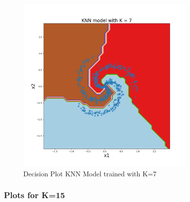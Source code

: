 \begin{figure}[!ht]
    \centering
    \includegraphics[height=3.5in]{Dataset_1b/K_7_decision_plot.png}
    \caption{Decision Plot KNN Model trained with K=7}
    \label{fig:16}
\end{figure}

\newpage
\subsubsection{Plots for K=15}

